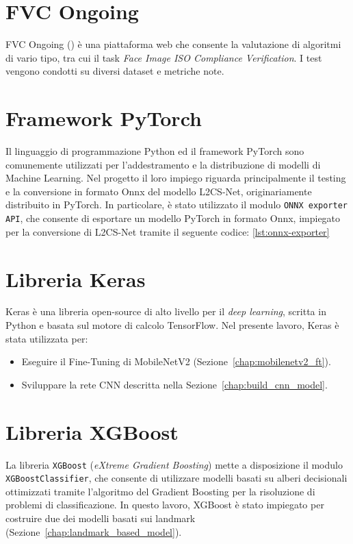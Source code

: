 \documentclass[12pt,a4paper,openright,twoside]{book}
\begin{document}
\section{FVC Ongoing}
FVC Ongoing (\cite{fvcongoing}) è una piattaforma web che consente la valutazione di algoritmi di vario tipo, tra cui il task \textit{Face Image ISO Compliance Verification}.
I test vengono condotti su diversi dataset e metriche note.

\section{Framework PyTorch}
Il linguaggio di programmazione Python ed il framework PyTorch sono comunemente utilizzati per l'addestramento e la distribuzione di modelli di Machine Learning. 
Nel progetto il loro impiego riguarda principalmente il testing e la conversione in formato Onnx del modello L2CS-Net, originariamente distribuito in PyTorch.
In particolare, è stato utilizzato il modulo \texttt{ONNX exporter API}, che consente di esportare un modello PyTorch in formato Onnx, impiegato per la conversione di L2CS-Net tramite il seguente codice: \cref{lst:onnx-exporter}


\section{Libreria Keras}
Keras è una libreria open-source di alto livello per il \textit{deep learning}, scritta in Python e basata sul motore di calcolo TensorFlow.  
Nel presente lavoro, Keras è stata utilizzata per:
\begin{itemize}
    \item Eseguire il Fine-Tuning di MobileNetV2 (Sezione~\ref{chap:mobilenetv2_ft}).
    \item Sviluppare la rete CNN descritta nella Sezione~\ref{chap:build_cnn_model}.
\end{itemize}

\section{Libreria XGBoost}
La libreria \texttt{XGBoost} (\textit{eXtreme Gradient Boosting}) \cite{xgboost} mette a disposizione il modulo \texttt{XGBoostClassifier}, che consente di utilizzare modelli basati su alberi decisionali ottimizzati tramite l'algoritmo del Gradient Boosting per la risoluzione di problemi di classificazione.  
In questo lavoro, XGBoost è stato impiegato per costruire due dei modelli basati sui landmark (Sezione~\ref{chap:landmark_based_model}).
\end{document}
